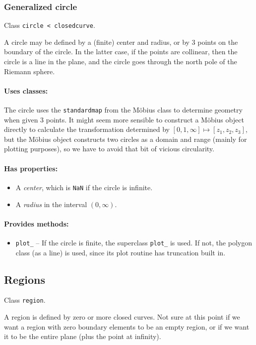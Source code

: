 \documentclass{article}
\newcommand{\code}[1]{\texttt{#1}}
\begin{document}
\subsubsection{Generalized circle}
Class \code{circle < closedcurve}.

A circle may be defined by a (finite) center and radius, or by 3 points on the boundary of the circle. In the latter case, if the points are collinear, then the circle is a line in the plane, and the circle goes through the north pole of the Riemann sphere.

\paragraph{Uses classes:} The circle uses the \code{standardmap} from the M\"obius class to determine geometry when given 3 points. It might seem more sensible to construct a M\"obius object directly to calculate the transformation determined by $[0,1,\infty]\mapsto[z_1, z_2, z_3]$, but the M\"obius object constructs two circles as a domain and range (mainly for plotting purposes), so we have to avoid that bit of vicious circularity.

\paragraph{Has properties:}
\begin{itemize}
  \item A \emph{center}, which is \code{NaN} if the circle is infinite.
  \item A \emph{radius} in the interval $(0,\infty)$.
\end{itemize}

\paragraph{Provides methods:}
\begin{itemize}
  \item \code{plot\_} -- If the circle is finite, the superclass \code{plot\_} is used. If not, the polygon class (as a line) is used, since its plot routine has truncation built in.
\end{itemize}

\subsection{Regions}
Class \code{region}.

A region is defined by zero or more closed curves. Not sure at this point if we want a region with zero boundary elements to be an empty region, or if we want it to be the entire plane (plus the point at infinity).
\end{document}
